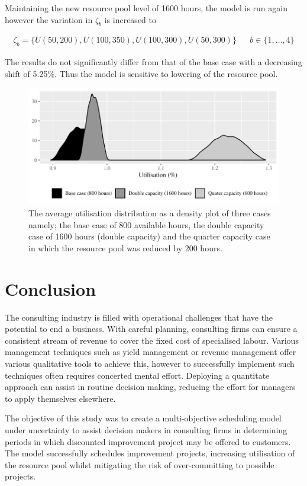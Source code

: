 \documentclass[a4paper,11pt]{article}
\begin{document}
Maintaining the new resource pool level of 1600 hours, the model is run again however the variation in $\zeta_b$ is increased to  

\begin{align}
	\zeta_b = \{U(50,200),U(100,350),U(100,300),U(50,300)\} && b\in \{1,\dots,4\}
\end{align}

The results do not significantly differ from that of the base case with a decreasing shift of 5.25\%. Thus the model is sensitive to lowering of the resource pool.

\begin{figure}[]
\label{fig:3}
\includegraphics[width=15cm]{../img/ggsens}
\caption{The average utilisation distribution as a density plot of three cases namely; the base case of 800 available hours, the double capacity case of 1600 hours (double capacity) and the quarter capacity case in which the resource pool was reduced by 200 hours.}
\end{figure}





\section{Conclusion}
The consulting industry is filled with operational challenges that have the potential to end a business. With careful planning, consulting firms can ensure a consistent stream of revenue to cover the fixed cost of specialised labour. Various management techniques such as yield management or revenue management offer various qualitative tools to achieve this, however to successfully implement such techniques often requires concerted mental effort. Deploying a quantitate approach can assist in routine decision making, reducing the effort for managers to apply themselves elsewhere. 

The objective of this study was to create a multi-objective scheduling model under uncertainty to assist decision makers in consulting firms in determining periods in which discounted improvement project may be offered to customers. The model successfully schedules improvement projects, increasing utilisation of the resource pool whilst mitigating the risk of over-committing to possible projects. 
\end{document}
